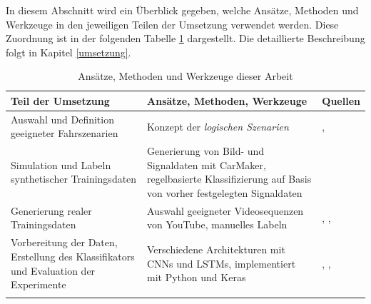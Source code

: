 In diesem Abschnitt wird ein Überblick gegeben, welche Ansätze, Methoden und Werkzeuge in den jeweiligen Teilen der Umsetzung verwendet werden. Diese Zuordnung ist in der folgenden Tabelle \ref{tab_konzept_methods} dargestellt. Die detaillierte Beschreibung folgt in Kapitel \ref{umsetzung}.

\begin{longtable}[c]{p{5cm} p{6.5cm} p{1.5cm}}
\textbf{Teil der Umsetzung} & \textbf{Ansätze, Methoden, Werkzeuge} & \textbf{Quellen} \\
\hline
\endhead

Auswahl und Definition geeigneter Fahrszenarien & Konzept der \textit{logischen Szenarien} & \cite{ulbrich2015defining}, \cite{bagschik2017szenarien} \\
\hline
Simulation und Labeln synthetischer Trainingsdaten & Generierung von Bild- und Signaldaten mit CarMaker, regelbasierte Klassifizierung auf Basis von vorher festgelegten Signaldaten & \cite{ipg2018carmaker} \\
\hline
Generierung realer Trainingsdaten & Auswahl geeigneter Videosequenzen von YouTube, manuelles Labeln & \cite{youtube2018video}, \cite{google2018route1}, \cite{google2018route2} \\
\hline
Vorbereitung der Daten, Erstellung des Klassifikators und Evaluation der Experimente & Verschiedene Architekturen mit \acp{CNN} und \acp{LSTM}, implementiert mit Python und Keras & \cite{chollet2015keras}, \cite{lecun2010convolutional}, \cite{hochreiter1997long} \\

\hline
\caption{Ansätze, Methoden und Werkzeuge dieser Arbeit}
\label{tab_konzept_methods}
\end{longtable}





